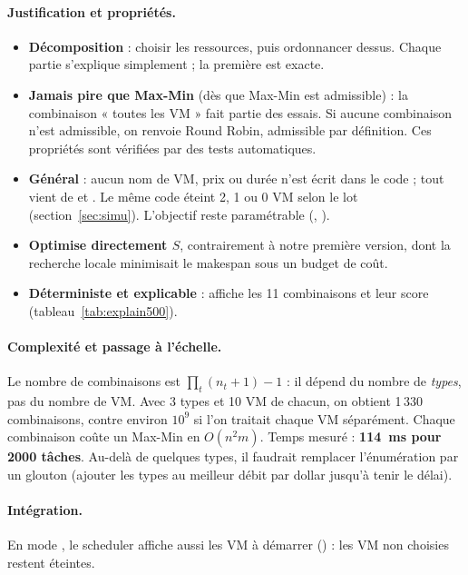 \paragraph{Justification et propriétés.}
\begin{itemize}
  \item \textbf{Décomposition} : choisir les ressources, puis ordonnancer dessus.
        Chaque partie s'explique simplement ; la première est exacte.
  \item \textbf{Jamais pire que Max-Min} (dès que Max-Min est admissible) : la
        combinaison « toutes les VM » fait partie des essais. Si aucune combinaison
        n'est admissible, on renvoie Round Robin, admissible par définition.
        Ces propriétés sont vérifiées par des tests automatiques.
  \item \textbf{Général} : aucun nom de VM, prix ou durée n'est écrit dans le code ;
        tout vient de  et . Le même code
        éteint 2, 1 ou 0 VM selon le lot (section~\ref{sec:simu}). L'objectif reste
        paramétrable (, ).
  \item \textbf{Optimise directement $S$}, contrairement à notre première version,
        dont la recherche locale minimisait le makespan sous un budget de coût.
  \item \textbf{Déterministe et explicable} :  affiche
        les 11 combinaisons et leur score (tableau~\ref{tab:explain500}).
\end{itemize}

\paragraph{Complexité et passage à l'échelle.} Le nombre de combinaisons est
$\prod_t (n_t + 1) - 1$ : il dépend du nombre de \emph{types}, pas du nombre de
VM. Avec 3 types et 10 VM de chacun, on obtient 1\,330 combinaisons, contre
environ $10^9$ si l'on traitait chaque VM séparément. Chaque combinaison coûte
un Max-Min en $O(n^2 m)$. Temps mesuré : \textbf{114~ms pour 2000 tâches}. Au-delà
de quelques types, il faudrait remplacer l'énumération par un glouton (ajouter
les types au meilleur débit par dollar jusqu'à tenir le délai).

\paragraph{Intégration.} En mode , le scheduler affiche aussi
les VM à démarrer () : les VM non
choisies restent éteintes.
